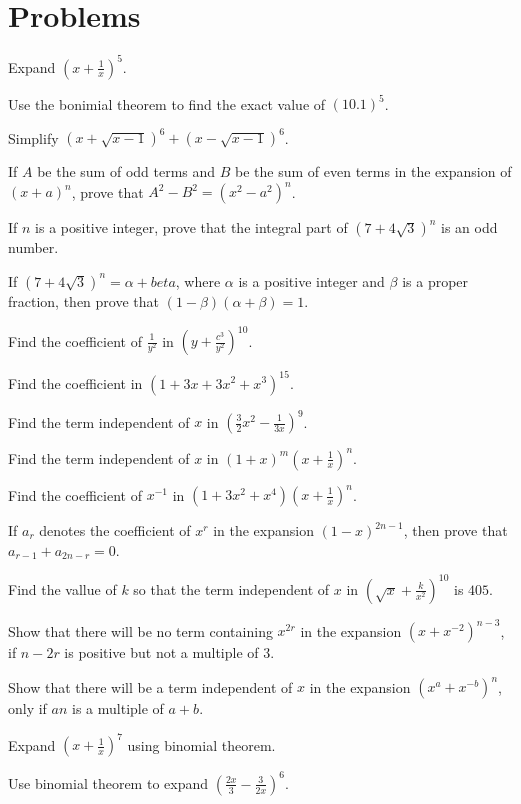 \section{Problems}

\startitemize[n, 1*broad]
\item Expand $\left(x + \frac{1}{x}\right)^5$.
\item Use the bonimial theorem to find the exact value of $(10.1)^5$.
\item Simplify $(x + \sqrt{x - 1})^6 + (x - \sqrt{x - 1})^6$.
\item If $A$ be the sum of odd terms and $B$ be the sum of even terms in the expansion of $(x + a)^n$, prove that $A^2 - B^2 = (x^2
  - a^2)^n$.
\item If $n$ is a positive integer, prove that the integral part of $(7 + 4\sqrt{3})^n$ is an odd number.
\item If $(7 + 4\sqrt{3})^n = \alpha + beta$, where $\alpha$ is a positive integer and $\beta$ is a proper fraction, then prove
  that $(1 - \beta)(\alpha + \beta) = 1$.
\item Find the coefficient of $\frac{1}{y^2}$ in $\left(y + \frac{c^3}{y^2}\right)^{10}$.
\item Find the coefficient in $(1 + 3x + 3x^2 + x^3)^{15}$.
\item Find the term independent of $x$ in $\left(\frac{3}{2}x^2 - \frac{1}{3x}\right)^9$.
\item Find the term independent of $x$ in $(1 + x)^m\left(x + \frac{1}{x}\right)^n$.
\item Find the coefficient of $x^{-1}$ in $(1 + 3x^2 + x^4)\left(x + \frac{1}{x}\right)^n$.
\item If $a_r$ denotes the coefficient of $x^r$ in the expansion $(1 - x)^{2n - 1}$, then prove that $a_{r - 1} + a_{2n - r} = 0$.
\item Find the vallue of $k$ so that the term independent of $x$ in $\left(\sqrt{x} + \frac{k}{x^2}\right)^{10}$ is $405$.
\item Show that there will be no term containing $x^{2r}$ in the expansion $(x + x^{-2})^{n - 3}$, if $n - 2r$ is positive but not
  a multiple of $3$.
\item Show that there will be a term independent of $x$ in the expansion $(x^a + x^{-b})^n$, only if $an$ is a multiple of $a + b$.
\item Expand $\left(x + \frac{1}{x}\right)^7$ using binomial theorem.
\item Use binomial theorem to expand $\left(\frac{2x}{3} - \frac{3}{2x}\right)^6$.
